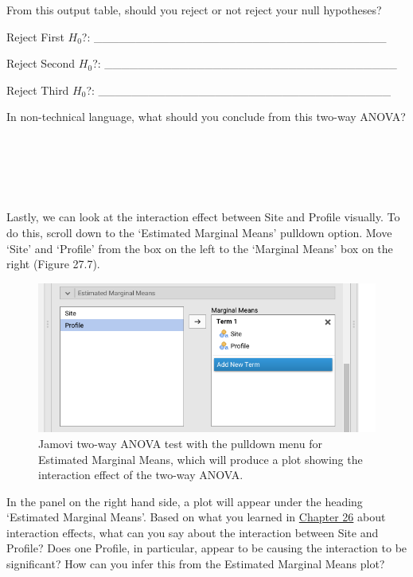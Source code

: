 \documentclass[
]{scrbook}
\begin{document}
From this output table, should you reject or not reject your null hypotheses?

Reject First \(H_{0}\)?: \_\_\_\_\_\_\_\_\_\_\_\_\_\_\_\_\_\_\_\_\_\_\_\_\_\_\_\_\_\_\_\_\_\_\_

Reject Second \(H_{0}\)?: \_\_\_\_\_\_\_\_\_\_\_\_\_\_\_\_\_\_\_\_\_\_\_\_\_\_\_\_\_\_\_\_\_\_\_

Reject Third \(H_{0}\)?: \_\_\_\_\_\_\_\_\_\_\_\_\_\_\_\_\_\_\_\_\_\_\_\_\_\_\_\_\_\_\_\_\_\_\_

In non-technical language, what should you conclude from this two-way ANOVA?

\begin{verbatim}





\end{verbatim}

Lastly, we can look at the interaction effect between Site and Profile visually.
To do this, scroll down to the `Estimated Marginal Means' pulldown option.
Move `Site' and `Profile' from the box on the left to the `Marginal Means' box on the right (Figure 27.7).

\begin{figure}
\includegraphics[width=1\linewidth]{img/jamovi_marginal_means} \caption{Jamovi two-way ANOVA test with the pulldown menu for Estimated Marginal Means, which will produce a plot showing the interaction effect of the two-way ANOVA.}\label{fig:unnamed-chunk-133}
\end{figure}

In the panel on the right hand side, a plot will appear under the heading `Estimated Marginal Means'.
Based on what you learned in \protect\hyperlink{Chapter_26}{Chapter 26} about interaction effects, what can you say about the interaction between Site and Profile?
Does one Profile, in particular, appear to be causing the interaction to be significant?
How can you infer this from the Estimated Marginal Means plot?
\end{document}

